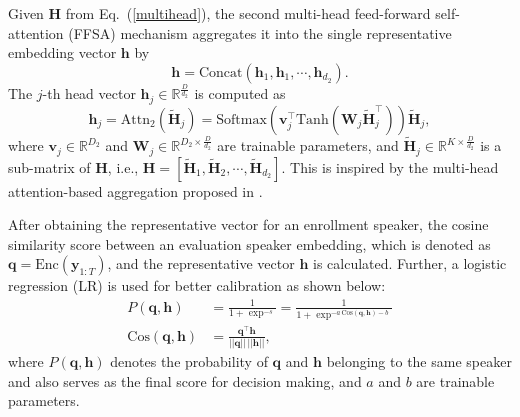 \documentclass{article}
\begin{document}
Given $\boldsymbol{H}$ from Eq.~(\ref{multihead}), the second multi-head feed-forward self-attention (FFSA) mechanism aggregates it into the single representative embedding vector $\boldsymbol{h}$ by 
\begin{equation}
    \label{multihead_aggregation}
    \boldsymbol{h} = {\text{Concat}}(\boldsymbol{h}_1, \boldsymbol{h}_1, \cdots, \boldsymbol{h}_{d_2}).
\end{equation}
The $j$-th head vector $\boldsymbol{h}_j\in\mathbb{R}^{\frac{D}{d_2}}$ is computed as
\begin{equation}
   \label{multihead_aggregation_2}
    \boldsymbol{h}_j = \text{Attn}_2{(\boldsymbol{\tilde{H}}_j)}=\text{Softmax}(\boldsymbol{v}_j^\top \text{Tanh}(\boldsymbol{W}_j \boldsymbol{\tilde{H}}_j^\top)) \boldsymbol{\tilde{H}}_j,
\end{equation}
where $\boldsymbol{v}_j\in\mathbb{R}^{D_{2}}$ and $\boldsymbol{W}_j\in\mathbb{R}^{D_{2}\times{\frac{D}{d_2}}}$ are trainable parameters, and $\boldsymbol{\tilde{H}}_j\in\mathbb{R}^{K\times{\frac{D}{d_2}}}$ is a sub-matrix of $\boldsymbol{H}$, i.e., $\boldsymbol{H}=[\boldsymbol{\tilde{H}}_1, \boldsymbol{\tilde{H}}_2, \cdots, \boldsymbol{\tilde{H}}_{d_2}]$.
This is inspired by the multi-head attention-based aggregation proposed in \cite{Lin2017-StructureATT}.

After obtaining the representative vector for an enrollment speaker, the cosine similarity score between an evaluation speaker embedding, which is denoted as $\boldsymbol{q} = \text{Enc}(\boldsymbol{y}_{1:T})$, and the representative vector $\boldsymbol{h}$ is calculated. Further, a logistic regression (LR)  is used for better calibration as shown below:
\begin{align}
    \label{equa:logistic}
    P(\boldsymbol{q},\boldsymbol{h}) 
    &= \frac{1}{1 + \exp^{-s}} 
    = \frac{1}{1 + \exp^{-a \, \text{Cos}(\boldsymbol{q},\boldsymbol{h}) - b}} \\
\mathrm{Cos}(\boldsymbol{q},\boldsymbol{h}) &=\frac{\boldsymbol{q} ^\top \boldsymbol{h}}{||\boldsymbol{q}||\,||\boldsymbol{h}||} ,
\end{align}
where $P(\boldsymbol{q},\boldsymbol{h})$ denotes the probability of $\boldsymbol{q}$ and $\boldsymbol{h}$ belonging to the same speaker and also serves as the final score for decision making, and $a$ and $b$ are trainable parameters.
\vspace{-1mm}
\end{document}
